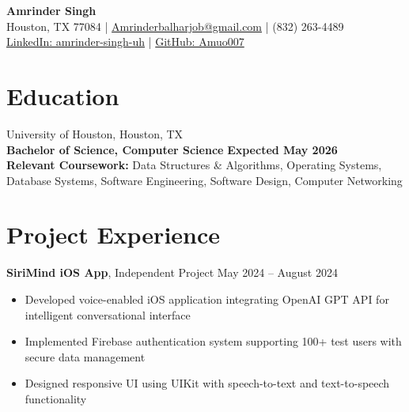 \documentclass[10pt, letterpaper]{article}
\begin{document}
\begin{center}
    {\bf\fontsize{24pt}{24pt}\selectfont Amrinder Singh} \\[0.3cm]
    Houston, TX 77084 \quad | \quad
    \href{mailto:Amrinderbalharjob@gmail.com}{Amrinderbalharjob@gmail.com} \quad | \quad
    (832) 263-4489 \\[0.1cm]
    \href{https://www.linkedin.com/in/amrinder-singh-uh-computer-science/}{LinkedIn: amrinder-singh-uh} \quad | \quad
    \href{https://github.com/Amuo007}{GitHub: Amuo007}
\end{center}

\section{Education}
University of Houston, Houston, TX \\
\textbf{Bachelor of Science, Computer Science} \hfill \textbf{Expected May 2026} \\
\textbf{Relevant Coursework:} Data Structures \& Algorithms, Operating Systems, Database Systems, Software Engineering, Software Design, Computer Networking

\section{Project Experience}
\textbf{SiriMind iOS App}, Independent Project \hfill May 2024 -- August 2024 
\begin{itemize}[leftmargin=0.5cm, itemsep=0.1cm]
    \item Developed voice-enabled iOS application integrating OpenAI GPT API for intelligent conversational interface
    \item Implemented Firebase authentication system supporting 100+ test users with secure data management
    \item Designed responsive UI using UIKit with speech-to-text and text-to-speech functionality
\end{itemize}
\end{document}
